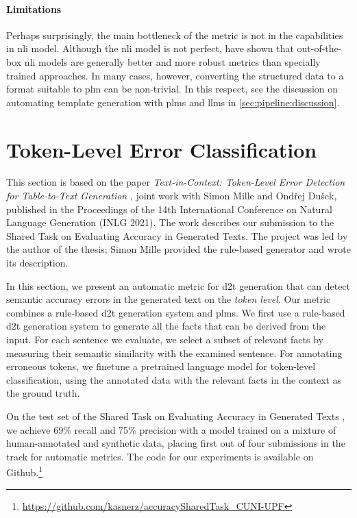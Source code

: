 \paragraph{Limitations} Perhaps surprisingly, the main bottleneck of the metric is not in the capabilities in \ac{nli} model. Although the \ac{nli} model is not perfect, \citet{chenMENLIRobustEvaluation2022} have shown that out-of-the-box \ac{nli} models are generally better and more robust metrics than specially trained approaches. In many cases, however, converting the structured data to a format suitable to \ac{plm} can be non-trivial. In this respect, see the discussion on automating template generation with \acp{plm} and \acp{llm} in \autoref{sec:pipeline:discussion}.


\section{Token-Level Error Classification}
\label{sec:tok-eval}

\begin{refbox}
    This section is based on the paper \emph{Text-in-Context: Token-Level Error Detection for Table-to-Text Generation} \cite{kasnerTextinContextTokenLevelError2021}, joint work with Simon Mille and Ondřej Dušek, published in the Proceedings of the 14th International Conference on Natural Language Generation (INLG 2021). The work describes our submission to the Shared Task on Evaluating Accuracy in Generated Texts. The project was led by the author of the thesis; Simon Mille provided the rule-based generator and wrote its description.
\end{refbox}


In this section, we present an automatic metric for \ac{d2t} generation that can detect semantic accuracy errors in the generated text on the \emph{token level}. Our metric combines a rule-based \ac{d2t} generation system and \acp{plm}. We first use a rule-based \ac{d2t} generation system to generate all the facts that can be derived from the input. For each sentence we evaluate, we select a subset of relevant facts by measuring their semantic similarity with the examined sentence. For annotating erroneous tokens, we finetune a pretrained language model for token-level classification, using the annotated data with the relevant facts in the context as the ground truth.

On the test set of the Shared Task on Evaluating Accuracy in Generated Texts \cite{thomsonGenerationChallengesResults2021}, we achieve 69\% recall and 75\% precision with a model trained on a mixture of human-annotated and synthetic data, placing first out of four submissions in the track for automatic metrics. The code for our experiments is available on Github.\footnote{\url{https://github.com/kasnerz/accuracySharedTask_CUNI-UPF}}


